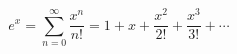\documentclass{article}
\begin{document}
\[
  e^{x} = \sum_{n=0}^{\infty} \frac{x^{n}}{n!}
        = 1 + x + \frac{x^2}{2!} + \frac{x^3}{3!} + \cdots
\]
\end{document}
